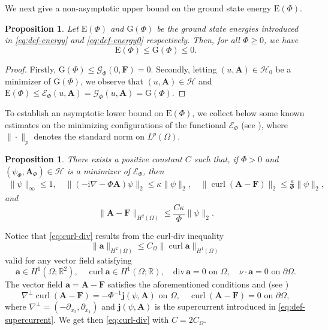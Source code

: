 \documentclass[11pt]{amsart}
\DeclareMathOperator{\curl}{curl}
\newcommand{\R}{\mathbb R}
\newcommand{\Ab}{\mathbf A}
\newcommand{\Fb}{\mathbf F}
\newcommand{\ab}{\mathbf a}
\newcommand{\ii}{\mathrm i}
\newcommand{\Ef}{\mathcal E_\Phi}
\newcommand{\En}{\mathrm E(\Phi)}
\newcommand{\Gf}{\mathcal G_\Phi}
\newcommand{\Gn}{\mathrm G(\Phi)}
\newcommand{\jb}{\mathbf j}
\newcommand{\cH}{\mathcal H}
\newtheorem{proposition}[theorem]{Proposition}
\theoremstyle{definition}
\numberwithin{equation}{section}
\begin{document}
We  next give a non-asymptotic upper bound on the ground state energy $\En$.

\begin{proposition}\label{prop:ub}
Let $\En$ and $\Gn$ be the ground state energies introduced in \eqref{eq:def-energy} and \eqref{eq:def-energy0} respectively. Then, for all $\Phi\geq 0$, we have
\[ \En\leq \Gn\leq 0.\]
\end{proposition}
\begin{proof}
Firstly,  $\Gn\leq \Gf(0,\Fb)=0$. Secondly, letting $(u,\Ab)\in\cH_0$ be a minimizer of $\Gn$,  we observe that $(u,\Ab)\in\cH$ and  $\En\leq \Ef(u,\Ab)=\Gf(u,\Ab)=\Gn$.
\end{proof}
%
To establish an asymptotic lower bound on $\En$,  we collect below some known  estimates on the minimizing configurations  of
the functional $\Ef$ (see \cite[Prop. 10.3.1 \& Lem. 10.3.2]{FH-b}), where $\|\cdot\|_p$ denotes the standard norm on $L^p(\Omega)$.
%
\begin{proposition}\label{prop:est-min}
There exists a positive constant $C$ such that, if $\Phi>0$ and $(\psi_\Phi,\Ab_\Phi)\in\cH$ is a minimizer  of $\Ef$,  then
\[\begin{gathered}
\|\psi\|_\infty\leq 1,\quad \|(-\ii\nabla-\Phi\Ab)\psi\|_2\leq \kappa\|\psi\|_2,\quad \|\curl(\Ab-\Fb)\|_2\leq \frac{\kappa}{\Phi}\|\psi\|_2,
\end{gathered}\]
and
\begin{equation}\label{eq:curl-div}
\|\Ab-\Fb\|_{H^2(\Omega)}\leq \frac{C\kappa}{\Phi}\|\psi\|_2.
\end{equation}
\end{proposition}
Notice that \eqref{eq:curl-div} results from the curl-div inequality
\[ \|\ab\|_{H^2(\Omega)}\leq C_\Omega\|\curl\ab\|_{H^1(\Omega)}\]
valid for any vector field satisfying
\[\ab\in H^1(\Omega;\R^2),\quad \curl\ab\in H^1(\Omega;\R),\quad \mathrm{div\,}\ab=0\text{ on }\Omega,\quad\nu\cdot\ab=0\text{ on }\partial\Omega.\]
The vector field $\ab=\Ab-\Fb$ satisfies the aforementioned conditions  and (see \cite[p.~143]{FH-b})
\begin{equation}\label{eq:curl-div*}
\nabla^\bot\curl(\Ab-\Fb)=-\Phi^{-1}\jb(\psi,\Ab)\text{ on }\Omega,\quad \curl(\Ab-\Fb)=0\text{ on }\partial\Omega,
\end{equation}
where $\nabla^\bot=(-\partial_{x_2},\partial_{x_1})$ and $\jb(\psi,\Ab)$ is the supercurrent introduced in \eqref{eq:def-supercurrent}. We get then \eqref{eq:curl-div} with $C=2C_\Omega$.\medskip
\end{document}

